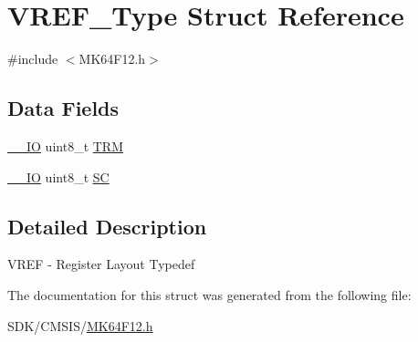 \hypertarget{struct_v_r_e_f___type}{}\section{V\+R\+E\+F\+\_\+\+Type Struct Reference}
\label{struct_v_r_e_f___type}


{\ttfamily \#include $<$M\+K64\+F12.\+h$>$}

\subsection*{Data Fields}
\begin{DoxyCompactItemize}
\item 
\mbox{\hyperlink{core__cm4_8h_aec43007d9998a0a0e01faede4133d6be}{\+\_\+\+\_\+\+IO}} uint8\+\_\+t \mbox{\hyperlink{group___v_r_e_f___peripheral___access___layer_gacdaf356ffe42125ef3a82e4439a2e3c9}{T\+RM}}
\item 
\mbox{\hyperlink{core__cm4_8h_aec43007d9998a0a0e01faede4133d6be}{\+\_\+\+\_\+\+IO}} uint8\+\_\+t \mbox{\hyperlink{group___v_r_e_f___peripheral___access___layer_ga369ca7d5284929a823dab79b7d10d81f}{SC}}
\end{DoxyCompactItemize}


\subsection{Detailed Description}
V\+R\+EF -\/ Register Layout Typedef 

The documentation for this struct was generated from the following file\+:\begin{DoxyCompactItemize}
\item 
S\+D\+K/\+C\+M\+S\+I\+S/\mbox{\hyperlink{_m_k64_f12_8h}{M\+K64\+F12.\+h}}\end{DoxyCompactItemize}
